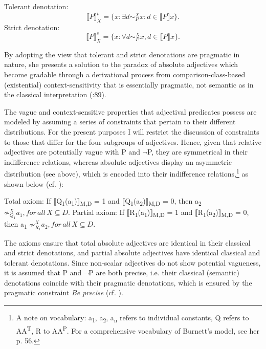 \documentclass[output=paper
,modfonts
,nonflat]{langsci/langscibook}
\begin{document}
\ea
	Tolerant denotation: \[ \llbracket P \rrbracket_X^t	= \{x : \exists d \sim_P^X  x : d \in \llbracket P\rrbracket x\}\text{.}\]
\z
\ea
	Strict denotation: \[\llbracket P\rrbracket_X^s  = \{ { x :  \forall d \sim _P^X  x, d  \in   \llbracket P \rrbracket x } \}\text{.}\]
\z

By adopting the view that tolerant and strict denotations are pragmatic in nature, she presents a solution to the paradox of absolute adjectives which become gradable through a derivational process from comparison-class-based (existential) context-sensitivity that is essentially pragmatic, not semantic as in the classical interpretation (\citeyear{Burnett2017}:89).

The vague and context-sensitive properties that adjectival predicates possess are modeled by assuming a series of constraints that pertain to their different distributions. For the present purposes I will restrict the discussion of constraints to those that differ for the four subgroups of adjectives. Hence, given that relative adjectives are potentially vague with P and $\neg$P, they are symmetrical in their indifference relations, whereas absolute adjectives display an asymmetric distribution (see above), which is encoded into their indifference relations,\footnote{A note on vocabulary: a\textsubscript{1}, a\textsubscript{2}, a\textsubscript{n} refers to individual constants, Q refers to AA\textsuperscript{T}, R to AA\textsuperscript{P}. For a comprehensive vocabulary of Burnett's model, see her p. 56.} as shown below (cf. \citealt[77]{Burnett2017}):

\ea
	Total axiom: If $\llbracket$Q\textsubscript{1}(a\textsubscript{1})$\rrbracket$\textsubscript{M,D} = 1 and $\llbracket$Q\textsubscript{1}(a\textsubscript{2})$\rrbracket$\textsubscript{M,D} = 0, then a\textsubscript{2} $ \not\sim_{Q_{1}}^X  a_{1}, for \, all \, X \subseteq D.$
\z
\ea
	Partial axiom: If $\llbracket$R\textsubscript{1}(a\textsubscript{1})$\rrbracket$\textsubscript{M,D} = 1 and $\llbracket$R\textsubscript{1}(a\textsubscript{2})$\rrbracket$\textsubscript{M,D} = 0, then a\textsubscript{1} $ \not\sim_{R_{1}}^X  a_{2}, for \, all \, X \subseteq D.$
\z

The axioms ensure that total absolute adjectives are identical in their classical and strict denotations, and partial absolute adjectives have identical classical and tolerant denotations. Since non-scalar adjectives do not show potential vagueness, it is assumed that P and $\neg$P are both precise, i.e. their classical (semantic) denotations coincide with their pragmatic denotations, which is ensured by the pragmatic constraint \textit{Be precise} (cf. \citealt[77--78]{Burnett2017}).
\end{document}
